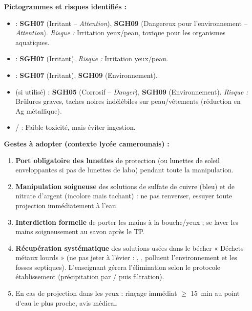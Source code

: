 \documentclass[11pt]{article}
\newcounter{popsec}
\newcounter{popsub}
\newcommand{\courssub}[1]{%
  \stepcounter{popsub}%
  \par\vspace{9pt}\noindent{\popxbold\fontsize{11.5}{13}\selectfont\color{popink}{\color{poporange}\thepopsec.\thepopsub}\hspace{6pt}#1}\par\nopagebreak\vspace{4pt}
}
\begin{document}
\courssub{Sécurité}
\begin{attention}
\textbf{Pictogrammes et risques identifiés :}
\begin{itemize}
    \item {} : \textbf{SGH07} (Irritant -- \emph{Attention}), \textbf{SGH09} (Dangereux pour l'environnement -- \emph{Attention}). \textit{Risque :} Irritation yeux/peau, toxique pour les organismes aquatiques.
    \item {} : \textbf{SGH07} (Irritant). \textit{Risque :} Irritation yeux/peau.
    \item {} : \textbf{SGH07} (Irritant), \textbf{SGH09} (Environnement).
    \item {} (si utilisé) : \textbf{SGH05} (Corrosif -- \emph{Danger}), \textbf{SGH09} (Environnement). \textit{Risque :} Brûlures graves, taches noires indélébiles sur peau/vêtements (réduction en Ag métallique).
    \item {} /  : Faible toxicité, mais éviter ingestion.
\end{itemize}
\textbf{Gestes à adopter (contexte lycée camerounais) :}
\begin{enumerate}
    \item \textbf{Port obligatoire des lunettes} de protection (ou lunettes de soleil enveloppantes si pas de lunettes de labo) pendant toute la manipulation.
    \item \textbf{Manipulation soigneuse} des solutions de sulfate de cuivre (bleu) et de nitrate d'argent (incolore mais tachant) : ne pas renverser, essuyer toute projection immédiatement à l'eau.
    \item \textbf{Interdiction formelle} de porter les mains à la bouche/yeux ; se laver les mains soigneusement au savon après le TP.
    \item \textbf{Récupération systématique} des solutions usées dans le bécher « Déchets métaux lourds » (ne pas jeter à l'évier : , ,  polluent l'environnement et les fosses septiques). L'enseignant gérera l'élimination selon le protocole établissement (précipitation par  /  puis filtration).
    \item En cas de projection dans les yeux : rinçage immédiat $\ge$ \SI{15}{min} au point d'eau le plus proche, avis médical.
\end{enumerate}
\end{attention}
\end{document}
